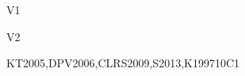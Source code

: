 \begin{syllabus}
\begin{competences}{V1}
    \item {} 
    \item {} 
    \item {} 
    \item {} 
    \item {} 
    \item {} 
\end{competences}

\begin{competences}{V2}
    \item {} 
    \item {} 
    \item {} 
    \item {} 
    \item {} 
    \item {} 
\end{competences}

\begin{unit}{\ALBasicAnalysis}{}{KT2005,DPV2006,CLRS2009,S2013,K1997}{10}{C1}
    \begin{topics}%
        \item \ALBasicAnalysisTopicDifferences\xspace
        \item \ALBasicAnalysisTopicAsymptotic\xspace
        \item \ALBasicAnalysisTopicBig\xspace
        \item \ALBasicAnalysisTopicComplexity\xspace
        \item \ALBasicAnalysisTopicEmpirical\xspace
        \item \ALBasicAnalysisTopicTime\xspace
        \item \ALBasicAnalysisTopicBigO\xspace
        \item \ALBasicAnalysisTopicLittle\xspace
        \item \ALBasicAnalysisTopicRecurrence\xspace
        \item \ALBasicAnalysisTopicAnalysis\xspace
        \item \ALBasicAnalysisTopicSome\xspace
    \end{topics}


\end{unit}
\end{syllabus}
